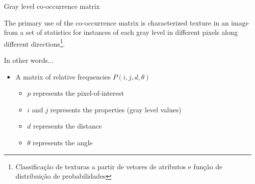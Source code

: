 \documentclass[notes]{beamer}
\begin{document}
\begin{frame}

\begin{block}{Gray level co-occurrence matrix}

The primary use of the co-occurrence matrix is characterized texture in an image from a set of statistics for instances of each gray level in different pixels
along different directions\footnote{Classificação de texturas a partir de vetores de atributos e função de distribuição de probabilidades\cite{Rocha}}.

\end{block}

\begin{block}{In other words...}

\begin{itemize}

\item A matrix of relative frequencies $P (i, j, d, \theta)$

\begin{itemize}

\item $p$ represents the pixel-of-interest

\item $i$ and $j$ represents the properties (gray level values)

\item $d$ represents the distance

\item $\theta$ represents the angle

\end{itemize}

\end{itemize}

\end{block}

{\let\thefootnote\relax\footnotetext{}}

\end{frame}
\end{document}
